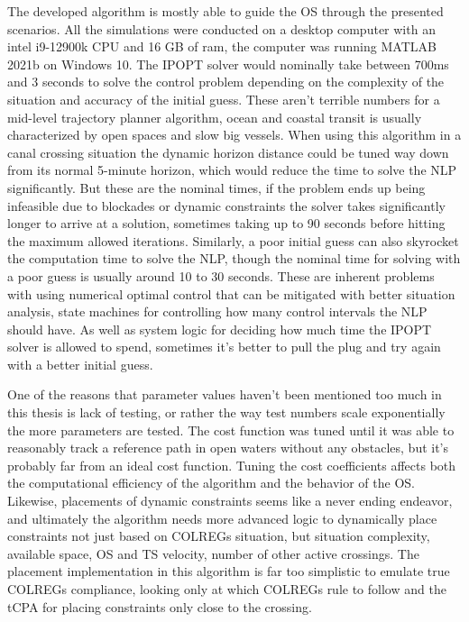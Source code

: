 The developed algorithm is mostly able to guide the OS through the presented scenarios. All the simulations were conducted on a desktop computer with an
intel i9-12900k CPU and 16 GB of ram, the computer was running MATLAB 2021b on Windows 10. The IPOPT solver would nominally take between
700ms and 3 seconds to solve the control problem depending on the complexity of the situation and accuracy of the initial guess. These aren't terrible numbers for a 
mid-level trajectory planner algorithm, ocean and coastal transit is usually characterized by open spaces and slow big vessels. When using this algorithm
in a canal crossing situation the dynamic horizon distance could be tuned way down from its normal 5-minute horizon, which would reduce the time to solve the NLP
significantly. But these are the nominal times, if the problem ends up being infeasible due to blockades or dynamic constraints the solver takes significantly longer
to arrive at a solution, sometimes taking up to 90 seconds before hitting the maximum allowed iterations. Similarly, a poor initial guess can also skyrocket the 
computation time to solve the NLP, though the nominal time for solving with a poor guess is usually around 10 to 30 seconds. These are inherent problems with using numerical
optimal control that can be mitigated with better situation analysis, state machines for controlling how many control intervals the NLP should have. As well as
system logic for deciding how much time the IPOPT solver is allowed to spend, sometimes it's better to pull the plug and try again with a better initial guess.

One of the reasons that parameter values haven't been mentioned too much in this thesis is lack of testing, or rather the way test numbers scale
exponentially the more parameters are tested. The cost function was tuned until it was able to reasonably track a reference path in open waters without any obstacles,
but it's probably far from an ideal cost function. Tuning the cost coefficients affects both the computational efficiency of the algorithm and the behavior of the OS.
Likewise, placements of dynamic constraints seems like a never ending endeavor, and ultimately the algorithm needs more advanced logic to dynamically place constraints
not just based on COLREGs situation, but situation complexity, available space, OS and TS velocity, number of other active crossings. The placement implementation
in this algorithm is far too simplistic to emulate true COLREGs compliance, looking only at which COLREGs rule to follow and the tCPA for placing constraints only close
to the crossing.

